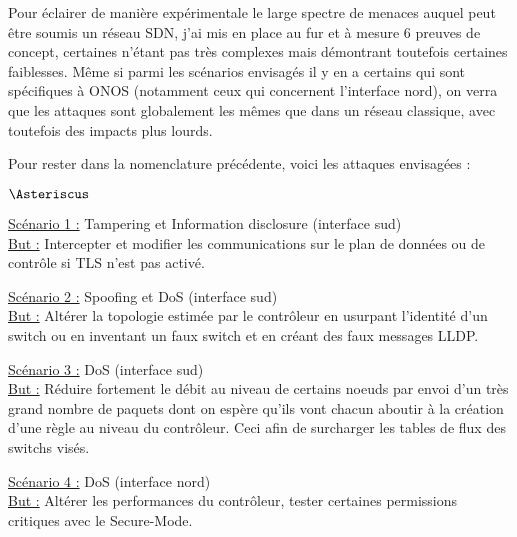 Pour éclairer de manière expérimentale le large spectre de menaces auquel peut être soumis un réseau SDN, j'ai mis en place au fur et à mesure 6 preuves de concept, certaines n'étant pas très complexes mais démontrant toutefois certaines faiblesses. Même si parmi les scénarios envisagés il y en a certains qui sont spécifiques à ONOS (notamment ceux qui concernent l'interface nord), on verra que les attaques sont globalement les mêmes que dans un réseau classique, avec toutefois des impacts plus lourds.

Pour rester dans la nomenclature précédente, voici les attaques envisagées :

\begin{list}{$\Asteriscus$}{}

\item \underline{Scénario 1 :} Tampering et Information disclosure (interface sud) \\
\underline{But :} Intercepter et modifier les communications sur le plan de données ou de contrôle si TLS n'est pas activé.

\item \underline{Scénario 2 :} Spoofing et DoS (interface sud) \\
\underline{But :} Altérer la topologie estimée par le contrôleur en usurpant l'identité d'un switch ou en inventant un faux switch et en créant des faux messages LLDP.

\item \underline{Scénario 3 :} DoS (interface sud) \\
\underline{But :} Réduire fortement le débit au niveau de certains noeuds par envoi d'un très grand nombre de paquets dont on espère qu'ils vont chacun aboutir à la création d'une règle au niveau du contrôleur. Ceci afin de surcharger les tables de flux des switchs visés.

\item \underline{Scénario 4 :} DoS (interface nord) \\
\underline{But :} Altérer les performances du contrôleur, tester certaines permissions critiques avec le Secure-Mode.

\end{list}